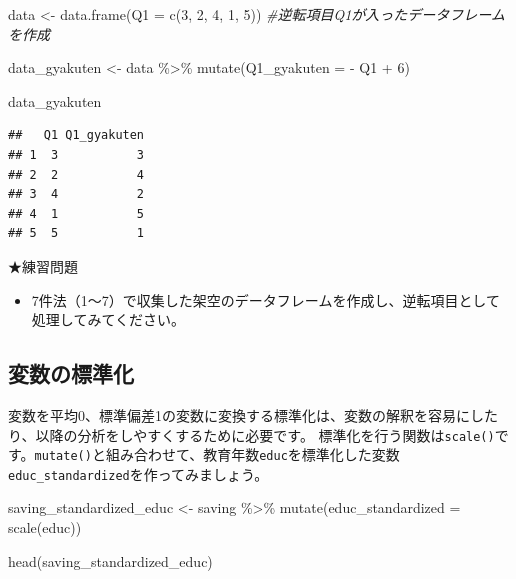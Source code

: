\documentclass[
]{book}
\newenvironment{Shaded}{\begin{snugshade}}{\end{snugshade}}
\newcommand{\AttributeTok}[1]{\textcolor[rgb]{0.77,0.63,0.00}{#1}}
\newcommand{\CommentTok}[1]{\textcolor[rgb]{0.56,0.35,0.01}{\textit{#1}}}
\newcommand{\DecValTok}[1]{\textcolor[rgb]{0.00,0.00,0.81}{#1}}
\newcommand{\FunctionTok}[1]{\textcolor[rgb]{0.00,0.00,0.00}{#1}}
\newcommand{\NormalTok}[1]{#1}
\newcommand{\OtherTok}[1]{\textcolor[rgb]{0.56,0.35,0.01}{#1}}
\newcommand{\SpecialCharTok}[1]{\textcolor[rgb]{0.00,0.00,0.00}{#1}}
\providecommand{\tightlist}{%
  \setlength{\itemsep}{0pt}\setlength{\parskip}{0pt}}
\begin{document}
\begin{Shaded}
\begin{Highlighting}[]
\NormalTok{data }\OtherTok{\textless{}{-}} \FunctionTok{data.frame}\NormalTok{(}\AttributeTok{Q1 =} \FunctionTok{c}\NormalTok{(}\DecValTok{3}\NormalTok{, }\DecValTok{2}\NormalTok{, }\DecValTok{4}\NormalTok{, }\DecValTok{1}\NormalTok{, }\DecValTok{5}\NormalTok{)) }\CommentTok{\#逆転項目Q1が入ったデータフレームを作成}

\NormalTok{data\_gyakuten }\OtherTok{\textless{}{-}} 
\NormalTok{  data }\SpecialCharTok{\%\textgreater{}\%}
    \FunctionTok{mutate}\NormalTok{(}\AttributeTok{Q1\_gyakuten =} \SpecialCharTok{{-}}\NormalTok{ Q1 }\SpecialCharTok{+} \DecValTok{6}\NormalTok{)}

\NormalTok{data\_gyakuten}
\end{Highlighting}
\end{Shaded}

\begin{verbatim}
##   Q1 Q1_gyakuten
## 1  3           3
## 2  2           4
## 3  4           2
## 4  1           5
## 5  5           1
\end{verbatim}

★練習問題

\begin{itemize}
\tightlist
\item
  7件法（1〜7）で収集した架空のデータフレームを作成し、逆転項目として処理してみてください。
\end{itemize}

\hypertarget{ux5909ux6570ux306eux6a19ux6e96ux5316}{%
\subsection{変数の標準化}\label{ux5909ux6570ux306eux6a19ux6e96ux5316}}

変数を平均0、標準偏差1の変数に変換する標準化は、変数の解釈を容易にしたり、以降の分析をしやすくするために必要です。
標準化を行う関数は\texttt{scale()}です。\texttt{mutate()}と組み合わせて、教育年数\texttt{educ}を標準化した変数\texttt{educ\_standardized}を作ってみましょう。

\begin{Shaded}
\begin{Highlighting}[]
\NormalTok{saving\_standardized\_educ }\OtherTok{\textless{}{-}}
\NormalTok{  saving }\SpecialCharTok{\%\textgreater{}\%}
    \FunctionTok{mutate}\NormalTok{(}\AttributeTok{educ\_standardized =} \FunctionTok{scale}\NormalTok{(educ))}

\FunctionTok{head}\NormalTok{(saving\_standardized\_educ)}
\end{Highlighting}
\end{Shaded}
\end{document}
